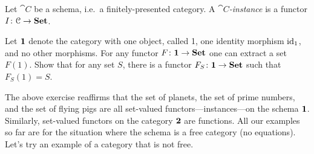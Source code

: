 \documentclass[7Sketches]{subfiles}
\begin{document}
\begin{definition}%
\label{rdef.instance}%
%
%
Let $\cat{C}$ be a schema, i.e.\ a finitely-presented category. A
\emph{$\cat{C}$-instance} is a functor
$I\colon\mathcal{C}\to\mathbf{Set}$.%
\end{definition}

\begin{exercise}%
\label{ex.set_1}
Let $\mathbf{1}$ denote the category with one object, called 1, one identity morphism $\mathrm{id}_1$, and no other morphisms. For any functor $F\colon\mathbf{1}\to\mathbf{Set}$ one can extract a set $F(1)$. Show that for any set $S$, there is a functor $F_S\colon\mathbf{1}\to\mathbf{Set}$ such that $F_S(1)=S$.
\end{exercise}

The above exercise reaffirms that the set of planets, the set of prime numbers, and the set of flying pigs are all set-valued functors---instances---on the schema $\mathbf{1}$. Similarly, set-valued functors on the category $\mathbf{2}$ are functions. All our examples so far are for the situation where the schema is a free category (no equations). Let's try an example of a category that is not free.
\end{document}

